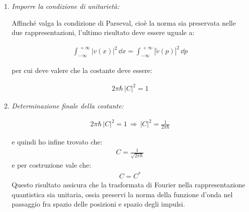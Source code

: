 \begin{myprf}
\begin{enumerate}[label=\arabic*)]
		grazie alla delta di Dirac, l'integrale su $\dd p'$ collassa:
	
	\begin{align*}
		\int_{-\infty}^{\, +\infty} \dd p'  \, \delta\qty(p - p') \tilde{v}^*(p') = \tilde{v}^*(p)
	\end{align*}
	
	ricordo infatti che vale in generale la definizione:
	
	\begin{align*}
		\int_{-\infty}^{\, +\infty} \dd x \, \delta\qty(x - x_0) \, f(x) = f(x_0)
	\end{align*}
		
		allora posso scrivere che:
	\begin{align*}
		\int_{-\infty}^{\, +\infty} |v(x)|^2 \, \dd x = 2\pi \hbar \, |C|^2 \int_{-\infty}^{\, +\infty} |\tilde{v}(p)|^2 \, \dd p
	\end{align*}
		
	\item \textit{Imporre la condizione di unitarietà:}
	
		Affinché valga la condizione di Parseval, cioè la norma sia preservata nelle due rappresentazioni, l'ultimo risultato deve essere uguale a:
		
	\begin{align*}
		\int_{-\infty}^{\, +\infty} |v(x)|^2 \, \dd x =  \int_{-\infty}^{\, +\infty} |\tilde{v}(p)|^2 \, \dd p
	\end{align*}
	
		per cui deve valere che la costante deve essere:
	
	\begin{align*}
		2\pi \hbar \, |C|^2 = 1
	\end{align*}
	
	\item \textit{Determinazione finale della costante:}
	
	\begin{align*}
		2\pi \hbar \, |C|^2 = 1 \, \Rightarrow \, |C|^2 = \frac{1}{2\pi \hbar}
	\end{align*}
	
	e quindi ho infine trovato che:
	\begin{align*}
		C = \frac{1}{\sqrt{2\pi \hbar}}
	\end{align*}
		e per costruzione vale che:
	\begin{align*}
		C = C^*
	\end{align*}
		Questo risultato assicura che la trasformata di Fourier nella rappresentazione quantistica sia unitaria, ossia preservi la norma della funzione d’onda nel passaggio fra spazio delle posizioni e spazio degli impulsi.
\end{enumerate}
\end{myprf}

